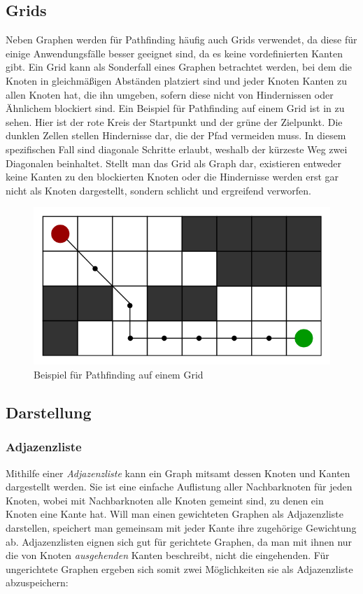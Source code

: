         \subsection{Grids}

            Neben Graphen werden für Pathfinding häufig auch Grids verwendet, da diese für einige Anwendungsfälle besser geeignet sind, da es keine vordefinierten Kanten gibt. Ein Grid kann als Sonderfall eines Graphen betrachtet werden, bei dem die Knoten in gleichmäßigen Abständen platziert sind und jeder Knoten Kanten zu allen Knoten hat, die ihn umgeben, sofern diese nicht von Hindernissen oder Ähnlichem blockiert sind. Ein Beispiel für Pathfinding auf einem Grid ist in  zu sehen. Hier ist der rote Kreis der Startpunkt und der grüne der Zielpunkt. Die dunklen Zellen stellen Hindernisse dar, die der Pfad vermeiden muss. In diesem spezifischen Fall sind diagonale Schritte erlaubt, weshalb der kürzeste Weg zwei Diagonalen beinhaltet. Stellt man das Grid als Graph dar, existieren entweder keine Kanten zu den blockierten Knoten oder die Hindernisse werden erst gar nicht als Knoten dargestellt, sondern schlicht und ergreifend verworfen.

            \begin{figure}
                \centering
                \includegraphics[width=0.5\linewidth]{images/grid-pathfinding.png}
                \caption{Beispiel für Pathfinding auf einem Grid\\\cite{EZ:Web02}}
                \label{fig:grid-pathfinding}
            \end{figure}

        \subsection{Darstellung} \label{darstellung}

            \subsubsection{Adjazenzliste}

                Mithilfe einer \emph{Adjazenzliste} kann ein Graph mitsamt dessen Knoten und Kanten dargestellt werden. Sie ist eine einfache Auflistung aller Nachbarknoten für jeden Knoten, wobei mit Nachbarknoten alle Knoten gemeint sind, zu denen ein Knoten eine Kante hat. Will man einen gewichteten Graphen als Adjazenzliste darstellen, speichert man gemeinsam mit jeder Kante ihre zugehörige Gewichtung ab. Adjazenzlisten eignen sich gut für gerichtete Graphen, da man mit ihnen nur die von Knoten \textit{ausgehenden} Kanten beschreibt, nicht die eingehenden. Für ungerichtete Graphen ergeben sich somit zwei Möglichkeiten sie als Adjazenzliste abzuspeichern:

